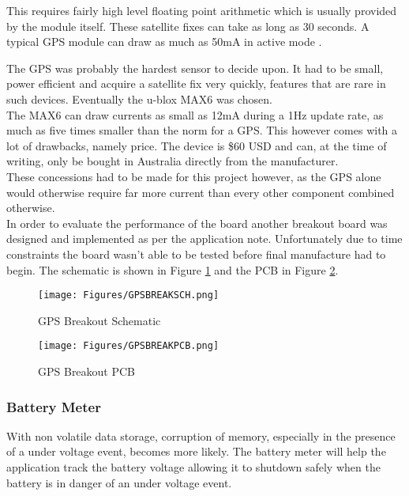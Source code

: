 \documentclass[12pt,openany,a4paper]{book}
\begin{document}
			This requires fairly high level floating point arithmetic which is usually provided by the module itself. These satellite fixes can take as long as 30 seconds. A typical GPS module can draw as much as 50mA in active mode \cite{Carroll10}.
						
			The GPS was probably the hardest sensor to decide upon. It had to be small, power efficient and acquire a satellite fix very quickly, features that are rare in such devices. Eventually the u-blox MAX6 \cite{ubloxGPS} was chosen. \\
			
			The MAX6 can draw currents as small as 12mA during a 1Hz update rate, as much as five times smaller than the norm for a GPS. This however comes with a lot of drawbacks, namely price. The device is \$60 USD and can, at the time of writing, only be bought in Australia directly from the manufacturer. \\
			
			These concessions had to be made for this project however, as the GPS alone would otherwise require far more current than every other component combined otherwise. \\
			
			In order to evaluate the performance of the board another breakout board was designed and implemented as per the application note. Unfortunately due to time constraints the board wasn't able to be tested before final manufacture had to begin. The schematic is shown in Figure \ref{fig:GPSBREAKSCH} and the PCB in Figure \ref{fig:GPSBREAKPCB}.
			
			\begin{figure}[H]
				\centering
				\texttt{[image: Figures/GPSBREAKSCH.png]}
				\caption{GPS Breakout Schematic}
				\label{fig:GPSBREAKSCH}
			\end{figure}		
			
			\begin{figure}[H]
				\centering
				\texttt{[image: Figures/GPSBREAKPCB.png]}
				\caption{GPS Breakout PCB}
				\label{fig:GPSBREAKPCB}
			\end{figure}				
			
			\subsubsection{Battery Meter}
			With non volatile data storage, corruption of memory, especially in the presence of a under voltage event, becomes more likely. The battery meter will help the application track the battery voltage allowing it to shutdown safely when the battery is in danger of an under voltage event. \\
			
\end{document}
